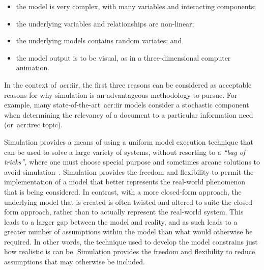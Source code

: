 \begin{itemize}
    \item{the model is very complex, with many variables and interacting components;}
    \item{the underlying variables and relationships are non-linear;}
    \item{the underlying models contains random variates; and}
    \item{the model output is to be visual, as in a three-dimensional computer animation.}
\end{itemize}

In the context of~\gls{acr:iir}, the first three reasons can be considered as acceptable reasons for why simulation is an advantageous methodology to pursue. For example, many state-of-the-art~\gls{acr:iir} models consider a stochastic component when determining the relevancy of a document to a particular information need (or~\gls{acr:trec} topic).

Simulation provides a means of using a uniform model execution technique that can be used to solve a large variety of systems, without resorting to a \emph{``bag of tricks'',} where one must choose special purpose and sometimes arcane solutions to avoid simulation~\citep{fishwick1995simulation}. Simulation provides the freedom and flexibility to permit the implementation of a model that better represents the real-world phenomenon that is being considered. In contrast, with a more closed-form approach, the underlying model that is created is often twisted and altered to suite the closed-form approach, rather than to actually represent the real-world system. This leads to a larger gap between the model and reality, and as such leads to a greater number of assumptions within the model than what would otherwise be required. In other words, the technique used to develop the model constrains just how realistic is can be. Simulation provides the freedom and flexibility to reduce assumptions that may otherwise be included.

